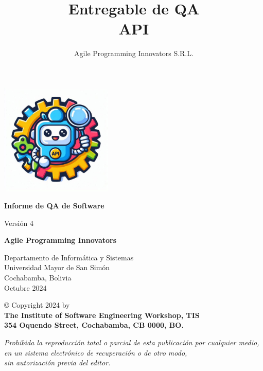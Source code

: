\documentclass[12pt,letterpaper]{article}
\author{Agile Programming Innovators S.R.L.}
\title{\textbf{Entregable de QA \\ API}}
\begin{document}
\begin{titlepage}
    \begin{center}
        \vspace*{1cm}

        \includegraphics[width=0.4\textwidth]{logo.png}
        
        \vspace{1cm}
        \Huge
        \textbf{Informe de QA de Software}
        
        \small
        Versión 4
            
            
        \vspace{0.5cm}
        \Large
        \textbf{Agile Programming Innovators}        
            
        \vspace{1cm}
               
        \Large
        Departamento de Informática y Sistemas\\
        Universidad Mayor de San Simón\\
        Cochabamba, Bolivia\\
        Octubre 2024

        \vfill

        \small
        © Copyright 2024 by\\
        \large
        \textbf{The Institute of Software Engineering Workshop, TIS}\\
       \textbf{ 354 Oquendo Street, Cochabamba, CB 0000, BO.}\\

        \vspace{1cm}
        
       \small
       \textit{Prohibida la reproducción total o parcial de esta publicación por cualquier medio,}\\
       \textit{en un sistema electrónico de recuperación o de otro modo,}\\
       \textit{sin autorización previa del editor.}\\
            
    \end{center}
\end{titlepage}
\newpage
\end{document}
